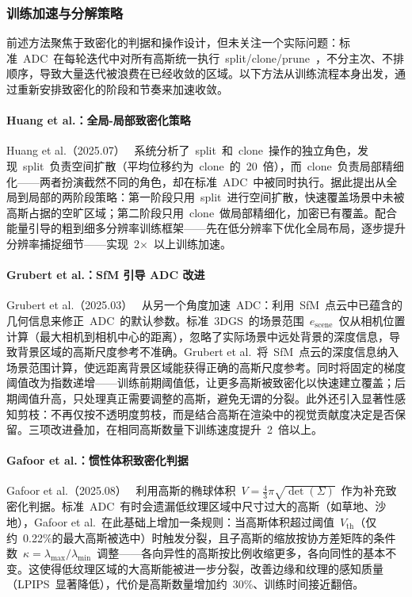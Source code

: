 \subsubsection{训练加速与分解策略}

前述方法聚焦于致密化的判据和操作设计，但未关注一个实际问题：标准~ADC~在每轮迭代中对所有高斯统一执行~split/clone/prune~，不分主次、不排顺序，导致大量迭代被浪费在已经收敛的区域。以下方法从训练流程本身出发，通过重新安排致密化的阶段和节奏来加速收敛。

\paragraph{Huang et al.：全局-局部致密化策略}
Huang et al.（2025.07）~\cite{2507_20239} 系统分析了~split~和~clone~操作的独立角色，发现~split~负责空间扩散（平均位移约为~clone~的~20~倍），而~clone~负责局部精细化——两者扮演截然不同的角色，却在标准~ADC~中被同时执行。据此提出从全局到局部的两阶段策略：第一阶段只用~split~进行空间扩散，快速覆盖场景中未被高斯占据的空旷区域；第二阶段只用~clone~做局部精细化，加密已有覆盖。配合能量引导的粗到细多分辨率训练框架——先在低分辨率下优化全局布局，逐步提升分辨率捕捉细节——实现~2$\times$~以上训练加速。

\paragraph{Grubert et al.：SfM 引导 ADC 改进}
Grubert et al.（2025.03）~\cite{2503_14274} 从另一个角度加速~ADC：利用~SfM~点云中已蕴含的几何信息来修正~ADC~的默认参数。标准~3DGS~的场景范围~$e_{\text{scene}}$~仅从相机位置计算（最大相机到相机中心的距离），忽略了实际场景中远处背景的深度信息，导致背景区域的高斯尺度参考不准确。Grubert et al.~将~SfM~点云的深度信息纳入场景范围计算，使远距离背景区域能获得正确的高斯尺度参考。同时将固定的梯度阈值改为指数递增——训练前期阈值低，让更多高斯被致密化以快速建立覆盖；后期阈值升高，只处理真正需要调整的高斯，避免无谓的分裂。此外还引入显著性感知剪枝：不再仅按不透明度剪枝，而是结合高斯在渲染中的视觉贡献度决定是否保留。三项改进叠加，在相同高斯数量下训练速度提升~2~倍以上。

\paragraph{Gafoor et al.：惯性体积致密化判据}
Gafoor et al.（2025.08）~\cite{2508_05187} 利用高斯的椭球体积~$V = \frac{4}{3}\pi\sqrt{\det(\Sigma)}$~作为补充致密化判据。标准~ADC~有时会遗漏低纹理区域中尺寸过大的高斯（如草地、沙地），Gafoor et al.~在此基础上增加一条规则：当高斯体积超过阈值~$V_{\text{th}}$（仅约~0.22\%的最大高斯被选中）时触发分裂，且子高斯的缩放按协方差矩阵的条件数~$\kappa = \lambda_{\max}/\lambda_{\min}$~调整——各向异性的高斯按比例收缩更多，各向同性的基本不变。这使得低纹理区域的大高斯能被进一步分裂，改善边缘和纹理的感知质量（LPIPS~显著降低），代价是高斯数量增加约~30\%、训练时间接近翻倍。

